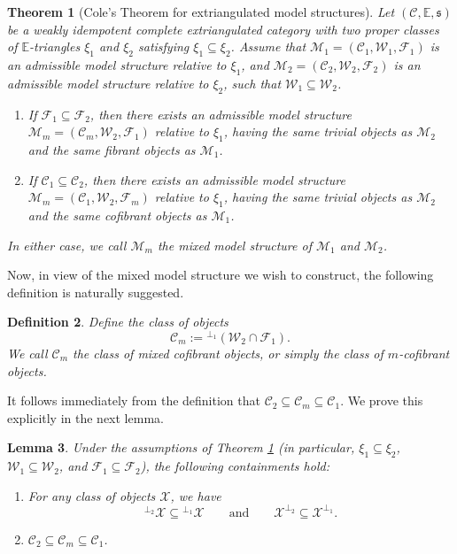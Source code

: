 \documentclass[11pt,a4paper]{amsart}
\numberwithin{equation}{section}
\theoremstyle{plain}
\newtheorem{thm}{Theorem}[section]
\newtheorem{lem}[thm]{Lemma}
\newtheorem{definition}[thm]{Definition}
\begin{document}
\begin{thm}[Cole's Theorem for extriangulated model structures]\label{prop:key_prop}
	Let $(\mathscr{C},\mathbb{E}, \mathfrak{s})$ be a weakly idempotent complete extriangulated category with two proper classes of $\mathbb{E}$-triangles $\xi_1$ and $\xi_2$ satisfying $\xi_1\subseteq \xi_2$. Assume that $\mathcal{M}_1=(\mathcal{C}_1,\mathcal{W}_1,\mathcal{F}_1)$ is an admissible model structure relative to $\xi_1$, and $\mathcal{M}_2=(\mathcal{C}_2,\mathcal{W}_2,\mathcal{F}_2)$ is an admissible model structure relative to $\xi_2$, such that $\mathcal{W}_1\subseteq \mathcal{W}_2$.
	
	\begin{enumerate}
		\item If $\mathcal{F}_1\subseteq \mathcal{F}_2$, then there exists an admissible model structure $\mathcal{M}_m=(\mathcal{C}_m,\mathcal{W}_2,\mathcal{F}_1)$ relative to $\xi_1$, having the same trivial objects as $\mathcal{M}_2$ and the same fibrant objects as $\mathcal{M}_1$.
		
		\item If $\mathcal{C}_1\subseteq \mathcal{C}_2$, then there exists an admissible model structure $\mathcal{M}_m=(\mathcal{C}_1,\mathcal{W}_2,\mathcal{F}_m)$ relative to $\xi_1$, having the same trivial objects as $\mathcal{M}_2$ and the same cofibrant objects as $\mathcal{M}_1$.
	\end{enumerate}
	
	In either case, we call $\mathcal{M}_m$ the \emph{mixed model structure} of $\mathcal{M}_1$ and $\mathcal{M}_2$.
\end{thm}

Now, in view of the mixed model structure we wish to construct, the following definition is naturally suggested.

\begin{definition}
	Define the class of objects
	\[ \mathcal{C}_m:={}^{\perp_1}(\mathcal{W}_2\cap \mathcal{F}_1). \]
	We call $\mathcal{C}_m$ the class of \emph{mixed cofibrant objects}, or simply the class of \emph{$m$-cofibrant objects}.
\end{definition}

It follows immediately from the definition that $\mathcal{C}_2\subseteq \mathcal{C}_m\subseteq \mathcal{C}_1$. We prove this explicitly in the next lemma.

\begin{lem}\label{lem:containments}
	Under the assumptions of Theorem \ref{prop:key_prop} (in particular, $\xi_1 \subseteq \xi_2$, $\mathcal{W}_1\subseteq \mathcal{W}_2$, and $\mathcal{F}_1\subseteq \mathcal{F}_2$), the following containments hold:
	\begin{enumerate}
		\item[(1)] For any class of objects $\mathcal{X}$, we have
		\[ {}^{\perp_2}\mathcal{X}\subseteq {}^{\perp_1}\mathcal{X} \qquad \text{and} \qquad \mathcal{X}^{\perp_2}\subseteq \mathcal{X}^{\perp_1}. \]
		\item[(2)] $\mathcal{C}_2\subseteq \mathcal{C}_m\subseteq \mathcal{C}_1$.
	\end{enumerate}
\end{lem}
\end{document}
